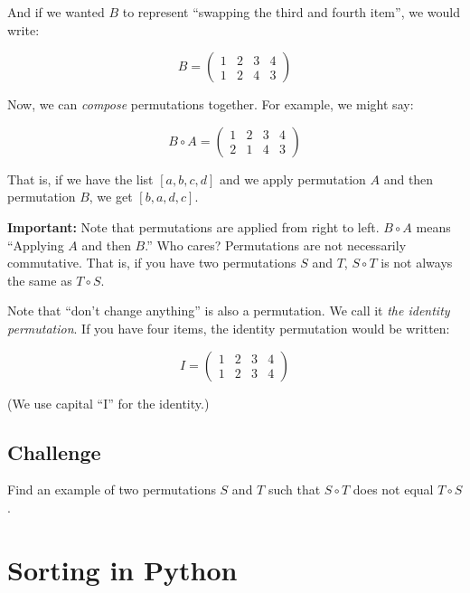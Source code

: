 And if we wanted $B$ to represent ``swapping the third and fourth item'', we would write:

$$B = \begin{pmatrix}                                                                                                                             
  1 & 2 & 3 & 4 \\                                                                                                                                
  1 & 2 & 4 & 3
\end{pmatrix}$$

Now, we can \textit{compose} permutations together. For example, we might say:

$$B \circ A = \begin{pmatrix}
  1 & 2 & 3 & 4 \\
  2 & 1 & 4 & 3
\end{pmatrix}$$

That is, if we have the list $[a, b, c, d]$ and we apply permutation $A$ and then permutation $B$, we get $[b, a, d, c]$.

\textbf{Important:} Note that permutations are applied from right to
left.  $B \circ A$ means ``Applying $A$ and then $B$.''  Who cares?
Permutations are not necessarily commutative. That is, if you have two
permutations $S$ and $T$, $S \circ T$ is not always the same as $T
\circ S$.

Note that ``don't change anything'' is also a permutation. We call it
\textit{the identity permutation}. If you have four items, the identity
permutation would be written:

$$I = \begin{pmatrix}
  1 & 2 & 3 & 4 \\
  1 & 2 & 3 & 4
\end{pmatrix}$$

(We use capital ``I'' for the identity.)

\subsection{Challenge} Find an example of two permutations $S$ and $T$ such that $S \circ T$ does not equal $T \circ S$.

\section{Sorting in Python}

